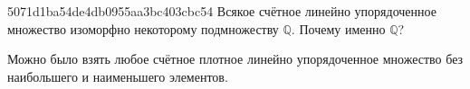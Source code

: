 \begin{note}{5071d1ba54de4db0955aa3bc403cbc54}
    Всякое счётное линейно упорядоченное множество изоморфно некоторому подмножеству \({ \mathbb Q }\).
    Почему именно \({ \mathbb Q }\)?

    \begin{cloze}{1}
        Можно было взять любое счётное плотное линейно упорядоченное множество без наибольшего и наименьшего элементов.
    \end{cloze}
\end{note}


